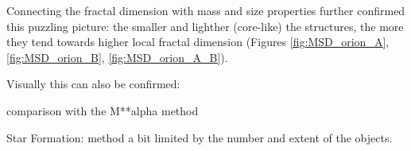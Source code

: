 Connecting the fractal dimension with mass and size properties further confirmed this puzzling picture: the smaller and lighther (core-like) the structures, the more they tend towards higher local fractal dimension (Figures \ref{fig:MSD_orion_A}, \ref{fig:MSD_orion_B}, \ref{fig:MSD_orion_A_B}).

Visually this can also be confirmed:




comparison with the M**alpha method

Star Formation: method a bit limited by the number and extent of the objects.